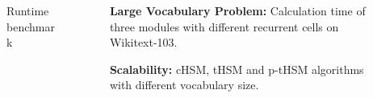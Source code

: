 \documentclass[final,t,unknownkeysallowed]{beamer}
\begin{document}
\begin{frame}{}
\begin{columns}[t]
\begin{column}{.3\linewidth}
\begin{block}{Runtime benchmark}
      
      \end{block}
    \end{column}



    \begin{column}{.3\linewidth}
    
    \begin{figure}
      \caption{\textbf{Large Vocabulary Problem:} Calculation time of three modules with different recurrent cells on Wikitext-103.}
      \end{figure}
    \begin{figure}
      \caption{\textbf{Scalability:}  cHSM, tHSM and p-tHSM algorithms with different vocabulary size. }
      \end{figure}
      
      
    

\end{column}
\end{columns}
\end{frame}
\end{document}
